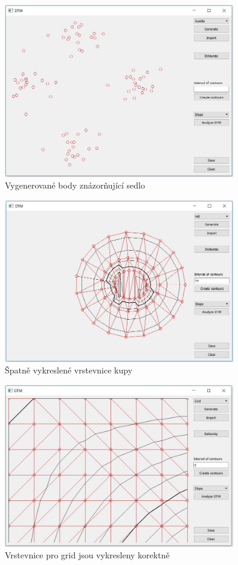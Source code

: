 \documentclass[a4paper, 12pt]{article}
\begin{document}
\begin{figure}[h!]
\centering
\includegraphics[width=10cm]{pictures/saddle.jpg}
\caption{Vygenerované body znázorňující sedlo}
\end{figure}

\begin{figure}[h!]
\centering
\includegraphics[width=10cm]{pictures/hill_bad.jpg}
\caption{Špatně vykreslené vrstevnice kupy}
\end{figure}

\begin{figure}[h!]
\centering
\includegraphics[width=10cm]{pictures/grid_ok.jpg}
\caption{Vrstevnice pro grid jsou vykresleny korektně}
\end{figure}
\end{document}
